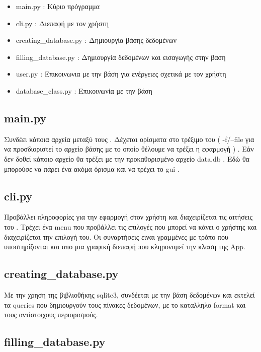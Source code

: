 \documentclass[manuscript,screen,review]{acmart}
\newcommand{\en}[1]{\foreignlanguage{english}{#1}}
\begin{document}
\begin{itemize}
    \item  \en{main.py} : Κύριο πρόγραμμα
    \item  \en{cli.py}  : Διεπαφή με τον χρήστη
    \item  \en{creating\_database.py} : Δημιουργία βάσης δεδομένων
    \item  \en{filling\_database.py} : Δημιουργία δεδομένων και εισαγωγής στην βαση
    \item  \en{user.py} : Επικοινωνια με την βάση για ενέργειες σχετικά με τον χρήστη
    \item  \en{database\_class.py } : Επικοινωνία με την βάση
\end{itemize}


\subsection{\en{main.py}}


 Συνδέει κάποια αρχεία μεταξύ τους . Δέχεται ορίσματα στο τρέξιμο του ( \en{-f/--file } για να προσδιοριστεί το αρχείο βάσης με το οποίο θέλουμε να τρέξει η εφαρμογή ) . 
 Εάν δεν δοθεί κάποιο αρχείο θα τρέξει με την προκαθορισμένο αρχείο \en{data.db} . 
 Εδώ θα μπορούσε να πάρει ένα ακόμα όρισμα και να τρέχει το \en{gui} . 


\subsection{\en{cli.py}}

 Προβάλλει πληροφορίες για την εφαρμογή στον χρήστη και διαχειρίζεται τις αιτήσεις του . Τρέχει ένα \en{menu} που προβάλλει τις επιλογές που μπορεί να κάνει ο χρήστης και διαχειρίζεται την επιλογή του. Οι συναρτήσεις ειναι γραμμένες με τρόπο που υποστηρίζονται και απο μια γραφική διεπαφή  που κληρονομεί την κλαση της \en{App}.
 


 \subsection{\en{creating\_database.py}}

 Με την χρηση της βιβλιοθήκης \en{sqlite3}, συνδέεται με την βάση δεδομένων και εκτελεί τα \en{queries} που δημιουργούν τους πίνακες δεδομένων, με το καταλληλο \en{format} και τους αντίστοιχους περιορισμούς. 

 \subsection{\en{filling\_database.py}}
\end{document}
